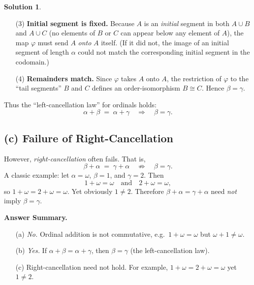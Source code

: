 \documentclass[12pt]{article}
\theoremstyle{definition} %
\newtheorem{solution}{Solution}
\theoremstyle{plain} %
\begin{document}
\begin{solution}
\begin{enumerate}
    \item[(3)] \textbf{Initial segment is fixed.}
    Because $A$ is an \emph{initial} segment in both $A \cup B$ and $A \cup C$ 
    (no elements of $B$ or $C$ can appear below any element of $A$), 
    the map $\varphi$ must send $A$ \emph{onto} $A$ itself. 
    (If it did not, the image of an initial segment of length $\alpha$ could not match the 
    corresponding initial segment in the codomain.)
    
    \item[(4)] \textbf{Remainders match.}
    Since $\varphi$ takes $A$ onto $A$, the restriction of $\varphi$ 
    to the ``tail segments'' $B$ and $C$ defines an order-isomorphism $B \cong C$. 
    Hence $\beta = \gamma$.
    \end{enumerate}
    
    Thus the ``left-cancellation law'' for ordinals holds:
    \[
    \alpha + \beta \;=\; \alpha + \gamma \quad \Longrightarrow\quad \beta = \gamma.
    \]
    
    \subsection*{(c) Failure of Right-Cancellation}
    
    However, \emph{right-cancellation} often fails. That is,
    \[
    \beta + \alpha \;=\; \gamma + \alpha \quad \not\Longrightarrow\quad \beta = \gamma.
    \]
    A classic example: let $\alpha = \omega$, $\beta = 1$, and $\gamma = 2$.  Then
    \[
    1 + \omega = \omega 
    \quad \text{and} \quad
    2 + \omega = \omega,
    \]
    so $1 + \omega = 2 + \omega = \omega$.  Yet obviously $1 \neq 2$. 
    Therefore $\beta + \alpha = \gamma + \alpha$ need \emph{not} imply $\beta = \gamma$.
    
    \bigskip
    
    \noindent
    \textbf{Answer Summary.}
    \begin{itemize}
    \item[(a)] \emph{No.} Ordinal addition is not commutative, e.g.\ $1 + \omega = \omega$ but $\omega + 1 \neq \omega$.
    \item[(b)] \emph{Yes.} If $\alpha + \beta = \alpha + \gamma$, then $\beta = \gamma$ (the left-cancellation law).
    \item[(c)] Right-cancellation need not hold.  For example, $1 + \omega = 2 + \omega = \omega$ yet $1 \neq 2$.
    \end{itemize} 
\end{solution}
\end{document}
